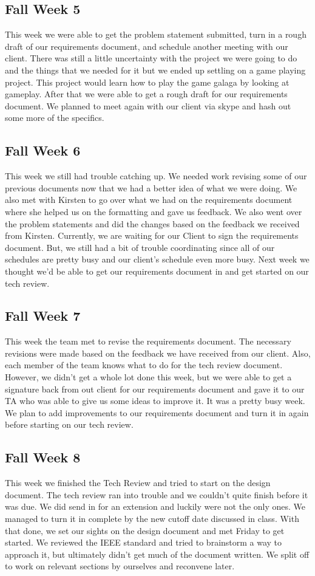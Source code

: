 \documentclass[onecolumn, draftclsnofoot,10pt, compsoc]{IEEEtran}
\begin{document}
\subsection{Fall Week 5}
This week we were able to get the problem statement submitted, turn in a rough draft of our requirements document, and schedule another meeting with our client.
There was still a little uncertainty with the project we were going to do and the things that we needed for it but we ended up settling on a game playing project.
This project would learn how to play the game galaga by looking at gameplay.
After that we were able to get a rough draft for our requirements document.
We planned to meet again with our client via skype and hash out some more of the specifics.

\subsection{Fall Week 6}
This week we still had trouble catching up.
We needed work revising some of our previous documents now that we had a better idea of what we were doing.
We also met with Kirsten to go over what we had on the requirements document where she helped us on the formatting and gave us feedback.
We also went over the problem statements and did the changes based on the feedback we received from Kirsten.
Currently, we are waiting for our Client to sign the requirements document.
But, we still had a bit of trouble coordinating since all of our schedules are pretty busy and our client's schedule even more busy.
Next week we thought we'd be able to get our requirements document in and get started on our tech review.

\subsection{Fall Week 7}
This week the team met to revise the requirements document.
The necessary revisions were made based on the feedback we have received from our client.
Also, each member of the team knows what to do for the tech review document.
However, we didn't get a whole lot done this week, but we were able to get a signature back from out client for our requirements document and gave it to our TA who was able to give us some ideas to improve it.
It was a pretty busy week. We plan to add improvements to our requirements document and turn it in again before starting on our tech review.

\subsection{Fall Week 8}
This week we finished the Tech Review and tried to start on the design document.
The tech review ran into trouble and we couldn't quite finish before it was due.
We did send in for an extension and luckily were not the only ones.
We managed to turn it in complete by the new cutoff date discussed in class.
With that done, we set our sights on the design document and met Friday to get started.
We reviewed the IEEE standard and tried to brainstorm a way to approach it, but ultimately didn't get much of the document written.
We split off to work on relevant sections by ourselves and reconvene later.
\end{document}
